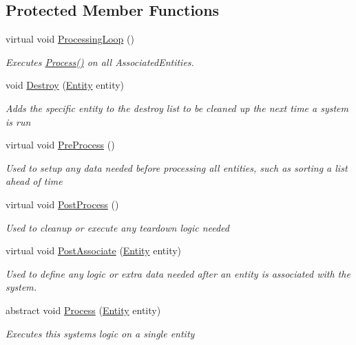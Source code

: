 \subsection*{Protected Member Functions}
\begin{DoxyCompactItemize}
\item 
virtual void \hyperlink{class_midnight_blue_1_1_engine_1_1_entity_component_1_1_entity_system_a3c740dc07a8f53fb9a1ae0769833d5ad}{Processing\+Loop} ()
\begin{DoxyCompactList}\small\item\em Executes \hyperlink{class_midnight_blue_1_1_engine_1_1_entity_component_1_1_entity_system_a94aa715ac6bfe9a720c3d12d56c7598c}{Process()} on all Associated\+Entities. \end{DoxyCompactList}\item 
void \hyperlink{class_midnight_blue_1_1_engine_1_1_entity_component_1_1_entity_system_ad81e1336d9fa1ae5bdbedce1dfa5db2b}{Destroy} (\hyperlink{class_midnight_blue_1_1_engine_1_1_entity_component_1_1_entity}{Entity} entity)
\begin{DoxyCompactList}\small\item\em Adds the specific entity to the destroy list to be cleaned up the next time a system is run \end{DoxyCompactList}\item 
virtual void \hyperlink{class_midnight_blue_1_1_engine_1_1_entity_component_1_1_entity_system_a779da2924653b4402ca386dbc52bd3b1}{Pre\+Process} ()
\begin{DoxyCompactList}\small\item\em Used to setup any data needed before processing all entities, such as sorting a list ahead of time \end{DoxyCompactList}\item 
virtual void \hyperlink{class_midnight_blue_1_1_engine_1_1_entity_component_1_1_entity_system_a65ff1877a5212e339f03e5c098976a80}{Post\+Process} ()
\begin{DoxyCompactList}\small\item\em Used to cleanup or execute any teardown logic needed \end{DoxyCompactList}\item 
virtual void \hyperlink{class_midnight_blue_1_1_engine_1_1_entity_component_1_1_entity_system_a1b4c3640c70033dd99ec707e0546168b}{Post\+Associate} (\hyperlink{class_midnight_blue_1_1_engine_1_1_entity_component_1_1_entity}{Entity} entity)
\begin{DoxyCompactList}\small\item\em Used to define any logic or extra data needed after an entity is associated with the system. \end{DoxyCompactList}\item 
abstract void \hyperlink{class_midnight_blue_1_1_engine_1_1_entity_component_1_1_entity_system_a94aa715ac6bfe9a720c3d12d56c7598c}{Process} (\hyperlink{class_midnight_blue_1_1_engine_1_1_entity_component_1_1_entity}{Entity} entity)
\begin{DoxyCompactList}\small\item\em Executes this systems logic on a single entity \end{DoxyCompactList}\end{DoxyCompactItemize}
